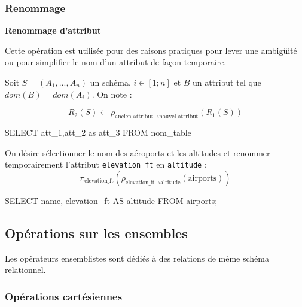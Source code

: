\documentclass[10pt,fleqn]{article} %
\begin{document}
\subsubsection{Renommage}
\begin{defi}
\textbf{Renommage d'attribut}

Cette opération est utilisée pour des raisons pratiques pour lever une ambigüité ou pour simplifier le nom d'un attribut de façon temporaire. 

Soit $S = (A_1,... ,A_n)$ un schéma, $ i \in[1;n]$ et $B$ un attribut tel que
$dom(B) = dom(A_i)$. On note :

$$
R_2 (S)\leftarrow \rho_{\text{ancien attribut} \rightarrow \text{nouvel attribut}}(R_1(S))
$$

\begin{envsql}
\begin{sql}
SELECT att_1,att_2 as att_3 FROM nom_table
\end{sql}
\end{envsql}

\end{defi}


\begin{exemple}
On désire sélectionner le nom des aéroports et les altitudes et  renommer temporairement l'attribut \texttt{elevation\_ft} en \texttt{altitude} :
\ifprof
$$
\pi_{\text{elevation\_ft}}\left(\rho_{\text{elevation\_ft} \rightarrow \text{altitude}}(\text{airports})\right)
$$
\begin{envsql}
\begin{sql}
SELECT name, elevation_ft AS altitude FROM airports;
\end{sql}
\end{envsql}
\else
\vspace{3cm}
\fi

\end{exemple}




\subsection{Opérations sur les ensembles}
\begin{rem}
Les opérateurs ensemblistes sont dédiés à des relations de même schéma relationnel. 
\end{rem}


\subsubsection{Opérations cartésiennes}
\end{document}
